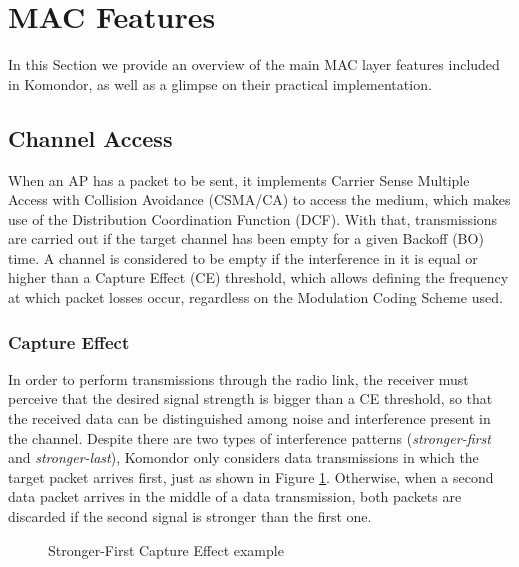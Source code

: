 \documentclass[a4paper]{article}
\begin{document}
\section{MAC Features}
\label{section:mac_features}
In this Section we provide an overview of the main MAC layer features included in Komondor, as well as a glimpse on their practical implementation.
	
	\subsection{Channel Access}
	\label{section:channel_access}
	When an AP has a packet to be sent, it implements Carrier Sense Multiple Access with Collision Avoidance (CSMA/CA) to access the medium, which makes use of the Distribution Coordination Function (DCF). With that, transmissions are carried out if the target channel has been empty for a given Backoff (BO) time. A channel is considered to be empty if the interference in it is equal or higher than a Capture Effect (CE) threshold, which allows defining the frequency at which packet losses occur, regardless on the Modulation Coding Scheme used.
		
		\subsubsection{Capture Effect}
		\label{section:capture_effect}
		In order to perform transmissions through the radio link, the receiver must perceive that the desired signal strength is bigger than a CE threshold, so that the received data can be distinguished among noise and interference present in the channel. Despite there are two types of interference patterns (\emph{stronger-first} and \emph{stronger-last}), Komondor only considers data transmissions in which the target packet arrives first, just as shown in Figure \ref{fig:capture_effect}. Otherwise, when a second data packet arrives in the middle of a data transmission, both packets are discarded if the second signal is stronger than the first one.
		\begin{figure}[h!]
	 		\centering
	 		\caption{Stronger-First Capture Effect example}
	 		\label{fig:capture_effect}
	 	\end{figure}
 	
\end{document}
